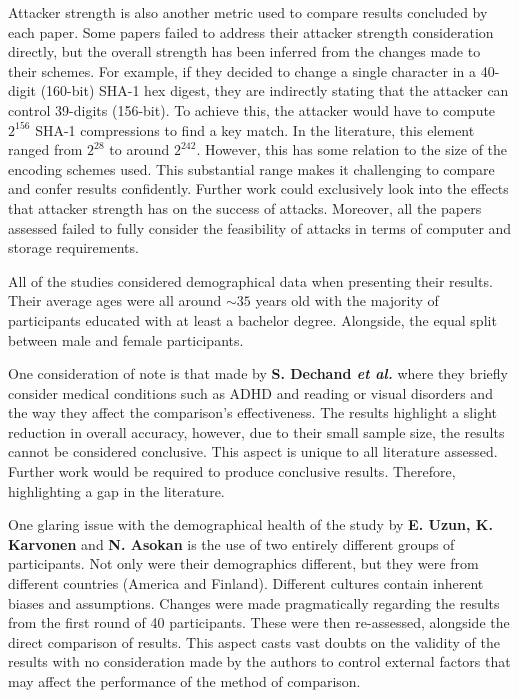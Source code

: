 Attacker strength is also another metric used to compare results concluded by each paper. Some papers failed to address their attacker strength consideration directly, but the overall strength has been inferred from the changes made to their schemes. For example, if they decided to change a single character in a 40-digit (160-bit) SHA-1 hex digest, they are indirectly stating that the attacker can control 39-digits (156-bit). To achieve this, the attacker would have to compute $2^{156}$ SHA-1 compressions to find a key match.
In the literature, this element ranged from $2^{28}$ to around $2^{242}$. However, this has some relation to the size of the encoding schemes used. This substantial range makes it challenging to compare and confer results confidently. 
Further work could exclusively look into the effects that attacker strength has on the success of attacks. Moreover, all the papers assessed failed to fully consider the feasibility of attacks in terms of computer and storage requirements. 

All of the studies considered demographical data when presenting their results. Their average ages were all around $\sim35$ years old with the majority of participants educated with at least a bachelor degree. Alongside, the equal split between male and female participants.

One consideration of note is that made by \textbf{S. Dechand \textit{et al.}}\cite{dechand2016empirical} where they briefly consider medical conditions such as ADHD and reading or visual disorders and the way they affect the comparison's effectiveness. The results highlight a slight reduction in overall accuracy, however, due to their small sample size, the results cannot be considered conclusive. This aspect is unique to all literature assessed. Further work would be required to produce conclusive results. Therefore, highlighting a gap in the literature.

One glaring issue with the demographical health of the study by \textbf{E. Uzun, K. Karvonen} and \textbf{N. Asokan}\cite{uzun2007usability} is the use of two entirely different groups of participants. Not only were their demographics different, but they were from different countries (America and Finland). Different cultures contain inherent biases and assumptions. Changes were made pragmatically regarding the results from the first round of 40 participants. These were then re-assessed, alongside the direct comparison of results. This aspect casts vast doubts on the validity of the results with no consideration made by the authors to control external factors that may affect the performance of the method of comparison.


